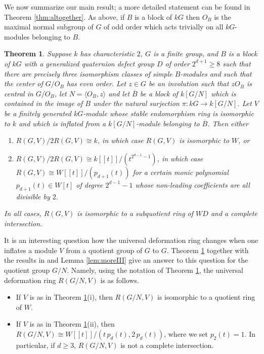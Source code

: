 \documentclass{amsart}
\theoremstyle{plain}
\newtheorem{thm}{Theorem}[section]
\theoremstyle{definition}
\theoremstyle{remark}
\begin{document}
We now summarize our main result;  a more detailed statement can be found in 
Theorem \ref{thm:altogether}. As above, if $B$ is a block of $kG$ then $O_B$ is the maximal 
normal subgroup of $G$ of odd order which acts trivially on all $kG$-modules belonging to $B$.
\begin{thm}
\label{thm:main}
Suppose $k$ has characteristic $2$, $G$ is a finite group, and $B$ is a block of $kG$ with a
generalized quaternion defect group $D$ of order $2^{d+1}\ge 8$ such that 
there are precisely three isomorphism classes of simple $B$-modules and such that
the center of $G/O_B$ has even order.
Let $z\in G$ be an involution such that $zO_B$ is central in $G/O_B$, let $N=\langle O_B,z\rangle$ 
and let $\overline{B}$ be a block of 
$k[G/N]$ which is contained in the image of $B$ under the natural surjection $\pi:kG\to k[G/N]$.
Let $V$ be a finitely generated $kG$-module whose stable endomorphism ring is isomorphic to $k$ 
and which is inflated from a $k[G/N]$-module belonging to $\overline{B}$.
Then either
\begin{enumerate}
\item[(i)] $R(G,V)/2R(G,V)\cong k$, in which case $R(G,V)$ is isomorphic to $W$, or
\item[(ii)] $R(G,V)/2R(G,V)\cong k[[t]]/(t^{2^{d-1}-1})$, in which case  $R(G,V)\cong W[[t]]/(p_{d+1}(t))$ 
for a certain monic polynomial $p_{d+1}(t)\in W[t]$ of degree $2^{d-1}-1$ whose non-leading 
coefficients are all divisible by $2$.
\end{enumerate}
In all cases, $R(G,V)$ is isomorphic to a subquotient ring of $WD$ and a complete intersection.
\end{thm}

It is an interesting question how the universal deformation ring changes
when one inflates a module $V$ from a quotient group of $G$  to $G$. 
Theorem \ref{thm:main} together with the results in \cite{bl,3sim}
and Lemma \ref{lem:moreIII}
give an answer to this question for the quotient group $G/N$.
Namely, using the notation of Theorem \ref{thm:main}, 
the universal deformation ring $R(G/N,V)$ is as follows.
\begin{itemize}
\item If $V$ is as in Theorem \ref{thm:main}(i), then $R(G/N,V)$ is isomorphic to a quotient ring
of $W$.
\item If $V$ is as in Theorem \ref{thm:main}(ii), then $R(G/N,V)\cong W[[t]]/(t\,p_d(t),2\,p_d(t))$,
where we set $p_2(t)=1$. In particular, if $d\ge 3$, $R(G/N,V)$ is not a complete 
intersection.
\end{itemize}
\end{document}
